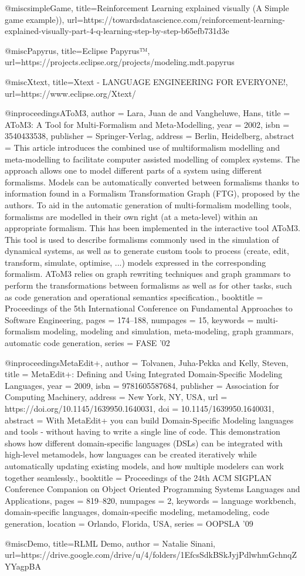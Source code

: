 @misc{simpleGame,
title={Reinforcement Learning explained visually (A Simple game example))},
url={https://towardsdatascience.com/reinforcement-learning-explained-visually-part-4-q-learning-step-by-step-b65efb731d3e
}
}

@misc{Papyrus,
title={Eclipse Papyrus™},
url={https://projects.eclipse.org/projects/modeling.mdt.papyrus}
}

@misc{Xtext,
title={Xtext - LANGUAGE ENGINEERING FOR EVERYONE!},
url={https://www.eclipse.org/Xtext/}
}

@inproceedings{AToM3,
author = {Lara, Juan de and Vangheluwe, Hans},
title = {AToM3: A Tool for Multi-Formalism and Meta-Modelling},
year = {2002},
isbn = {3540433538},
publisher = {Springer-Verlag},
address = {Berlin, Heidelberg},
abstract = {This article introduces the combined use of multiformalism modelling and meta-modelling to facilitate computer assisted modelling of complex systems. The approach allows one to model different parts of a system using different formalisms. Models can be automatically converted between formalisms thanks to information found in a Formalism Transformation Graph (FTG), proposed by the authors. To aid in the automatic generation of multi-formalism modelling tools, formalisms are modelled in their own right (at a meta-level) within an appropriate formalism. This has been implemented in the interactive tool AToM3. This tool is used to describe formalisms commonly used in the simulation of dynamical systems, as well as to generate custom tools to process (create, edit, transform, simulate, optimise, ...) models expressed in the corresponding formalism. AToM3 relies on graph rewriting techniques and graph grammars to perform the transformations between formalisms as well as for other tasks, such as code generation and operational semantics specification.},
booktitle = {Proceedings of the 5th International Conference on Fundamental Approaches to Software Engineering},
pages = {174–188},
numpages = {15},
keywords = {multi-formalism modeling, modeling and simulation, meta-modeling, graph grammars, automatic code generation},
series = {FASE '02}
}

@inproceedings{MetaEdit+,
author = {Tolvanen, Juha-Pekka and Kelly, Steven},
title = {MetaEdit+: Defining and Using Integrated Domain-Specific Modeling Languages},
year = {2009},
isbn = {9781605587684},
publisher = {Association for Computing Machinery},
address = {New York, NY, USA},
url = {https://doi.org/10.1145/1639950.1640031},
doi = {10.1145/1639950.1640031},
abstract = {With MetaEdit+ you can build Domain-Specific Modeling languages and tools - without having to write a single line of code. This demonstration shows how different domain-specific languages (DSLs) can be integrated with high-level metamodels, how languages can be created iteratively while automatically updating existing models, and how multiple modelers can work together seamlessly.},
booktitle = {Proceedings of the 24th ACM SIGPLAN Conference Companion on Object Oriented Programming Systems Languages and Applications},
pages = {819–820},
numpages = {2},
keywords = {language workbench, domain-specific languages, domain-specific modeling, metamodeling, code generation},
location = {Orlando, Florida, USA},
series = {OOPSLA '09}
}

@misc{Demo,
title={RLML Demo},
author = {Natalie Sinani},
url={https://drive.google.com/drive/u/4/folders/1EfcsSdkBSkJyjPdlwhmGchnqZYYagpBA}
}
